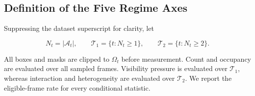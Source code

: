 \subsection{Definition of the Five Regime Axes}
\label{app:five_axis_definitions}

Suppressing the dataset superscript for clarity, let

\[
N_t=|\mathcal A_t|,
\qquad
\mathcal T_1=\{t:N_t\ge1\},
\qquad
\mathcal T_2=\{t:N_t\ge2\}.
\]

All boxes and masks are clipped to \(\Omega_t\) before measurement.
Count and occupancy are evaluated over all sampled frames. Visibility
pressure is evaluated over \(\mathcal T_1\), whereas interaction and
heterogeneity are evaluated over \(\mathcal T_2\). We report the
eligible-frame rate for every conditional statistic.

